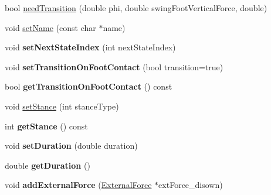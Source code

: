 \begin{DoxyCompactItemize}
\item 
bool \hyperlink{classCartWheel_1_1Core_1_1SimBiConState_ab81a60307b3864c9db6953a09b8e53c1}{needTransition} (double phi, double swingFootVerticalForce, double)
\item 
void \hyperlink{classCartWheel_1_1Core_1_1SimBiConState_a8209dec439b619e93f5aaeef082099ba}{setName} (const char $\ast$name)
\item 
\hypertarget{classCartWheel_1_1Core_1_1SimBiConState_a7039b671b046b1b210baf1cea5767bf8}{
void {\bfseries setNextStateIndex} (int nextStateIndex)}
\label{classCartWheel_1_1Core_1_1SimBiConState_a7039b671b046b1b210baf1cea5767bf8}

\item 
\hypertarget{classCartWheel_1_1Core_1_1SimBiConState_ac7186c63603f018b251ecc520c151338}{
void {\bfseries setTransitionOnFootContact} (bool transition=true)}
\label{classCartWheel_1_1Core_1_1SimBiConState_ac7186c63603f018b251ecc520c151338}

\item 
\hypertarget{classCartWheel_1_1Core_1_1SimBiConState_a7449541b5a033de468335a19e92a1562}{
bool {\bfseries getTransitionOnFootContact} () const }
\label{classCartWheel_1_1Core_1_1SimBiConState_a7449541b5a033de468335a19e92a1562}

\item 
void \hyperlink{classCartWheel_1_1Core_1_1SimBiConState_a40c20a88587b8e9aada69d55bdbe9d96}{setStance} (int stanceType)
\item 
\hypertarget{classCartWheel_1_1Core_1_1SimBiConState_a9793328df49d41591c2b2fd04f4ab825}{
int {\bfseries getStance} () const }
\label{classCartWheel_1_1Core_1_1SimBiConState_a9793328df49d41591c2b2fd04f4ab825}

\item 
\hypertarget{classCartWheel_1_1Core_1_1SimBiConState_afbe1415ca4470a740f12a3b42e7148b0}{
void {\bfseries setDuration} (double duration)}
\label{classCartWheel_1_1Core_1_1SimBiConState_afbe1415ca4470a740f12a3b42e7148b0}

\item 
\hypertarget{classCartWheel_1_1Core_1_1SimBiConState_a38fa7dc3b59aedcc051f6f327158185f}{
double {\bfseries getDuration} ()}
\label{classCartWheel_1_1Core_1_1SimBiConState_a38fa7dc3b59aedcc051f6f327158185f}

\item 
\hypertarget{classCartWheel_1_1Core_1_1SimBiConState_ad5aa2fd5989d36a6cb44fbf010c11f36}{
void {\bfseries addExternalForce} (\hyperlink{classCartWheel_1_1Core_1_1ExternalForce}{ExternalForce} $\ast$extForce\_\-disown)}
\label{classCartWheel_1_1Core_1_1SimBiConState_ad5aa2fd5989d36a6cb44fbf010c11f36}


\end{DoxyCompactItemize}
